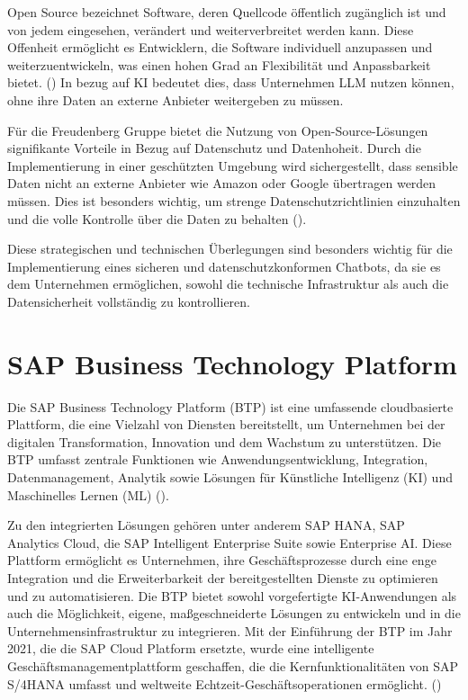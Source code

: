 Open Source bezeichnet Software, deren Quellcode öffentlich zugänglich ist und von jedem eingesehen, verändert und weiterverbreitet werden kann. 
Diese Offenheit ermöglicht es Entwicklern, die Software individuell anzupassen und weiterzuentwickeln, was einen hohen Grad an Flexibilität und Anpassbarkeit bietet. (\cite[S. 1]{Engelfried2010})
In bezug auf \ac{KI} bedeutet dies, dass Unternehmen \ac{LLM} nutzen können, ohne ihre Daten an externe Anbieter weitergeben zu müssen.

Für die Freudenberg Gruppe bietet die Nutzung von Open-Source-Lösungen signifikante Vorteile in Bezug auf Datenschutz und Datenhoheit. 
Durch die Implementierung in einer geschützten Umgebung wird sichergestellt, dass sensible Daten nicht an externe Anbieter wie Amazon oder Google übertragen werden müssen. 
Dies ist besonders wichtig, um strenge Datenschutzrichtlinien einzuhalten und die volle Kontrolle über die Daten zu behalten (\cite[S. 781 f.]{Nowak2024}).

Diese strategischen und technischen Überlegungen sind besonders wichtig für die Implementierung eines sicheren und datenschutzkonformen Chatbots, da sie es dem Unternehmen ermöglichen, 
sowohl die technische Infrastruktur als auch die Datensicherheit vollständig zu kontrollieren.

\section{SAP Business Technology Platform}

Die SAP Business Technology Platform (\ac{BTP}) ist eine umfassende cloudbasierte Plattform, die eine Vielzahl von Diensten bereitstellt, um Unternehmen bei der digitalen Transformation, 
Innovation und dem Wachstum zu unterstützen. Die \ac{BTP} umfasst zentrale Funktionen wie Anwendungsentwicklung, Integration, Datenmanagement, 
Analytik sowie Lösungen für Künstliche Intelligenz (\ac{KI}) und Maschinelles Lernen (\ac{ML}) (\cite[S. 103]{Gupta2024}). 

Zu den integrierten Lösungen gehören unter anderem SAP HANA, SAP Analytics Cloud, die SAP Intelligent Enterprise Suite sowie Enterprise AI. 
Diese Plattform ermöglicht es Unternehmen, ihre Geschäftsprozesse durch eine enge Integration und die Erweiterbarkeit der bereitgestellten Dienste zu optimieren und zu automatisieren. 
Die \ac{BTP} bietet sowohl vorgefertigte \ac{KI}-Anwendungen als auch die Möglichkeit, eigene, maßgeschneiderte Lösungen zu entwickeln und in die Unternehmensinfrastruktur zu integrieren. 
Mit der Einführung der \ac{BTP} im Jahr 2021, die die SAP Cloud Platform ersetzte, wurde eine intelligente Geschäftsmanagementplattform geschaffen, 
die die Kernfunktionalitäten von SAP S/4HANA umfasst und weltweite Echtzeit-Geschäftsoperationen ermöglicht. (\cite[S. 8 f.]{hrischevartificial}) 

